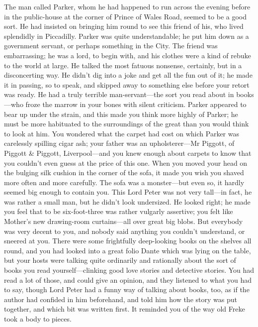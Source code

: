 The man called Parker, whom he had happened to run across the evening before in the public-house at the corner of Prince of Wales Road, seemed to be a good sort. He had insisted on bringing him round to see this friend of his, who lived splendidly in Piccadilly. Parker was quite understandable; he put him down as a government servant, or perhaps something in the City. The friend was embarrassing; he was a lord, to begin with, and his clothes were a kind of rebuke to the world at large. He talked the most fatuous nonsense, certainly, but in a disconcerting way. He didn’t dig into a joke and get all the fun out of it; he made it in passing, so to speak, and skipped away to something else before your retort was ready. He had a truly terrible man-servant\allowbreak---\allowbreak the sort you read about in books\allowbreak---\allowbreak who froze the marrow in your bones with silent criticism. Parker appeared to bear up under the strain, and this made you think more highly of Parker; he must be more habituated to the surroundings of the great than you would think to look at him. You wondered what the carpet had cost on which Parker was carelessly spilling cigar ash; your father was an upholsterer\allowbreak---\allowbreak Mr Piggott, of Piggott \& Piggott, Liverpool\allowbreak---\allowbreak and you knew enough about carpets to know that you couldn’t even guess at the price of this one. When you moved your head on the bulging silk cushion in the corner of the sofa, it made you wish you shaved more often and more carefully. The sofa was a monster\allowbreak---\allowbreak but even so, it hardly seemed big enough to contain you. This Lord Peter was not very tall\allowbreak---\allowbreak in fact, he was rather a small man, but he didn’t look undersized. He looked right; he made you feel that to be six-foot-three was rather vulgarly assertive; you felt like Mother’s new drawing-room curtains\allowbreak---\allowbreak all over great big blobs. But everybody was very decent to you, and nobody said anything you couldn’t understand, or sneered at you. There were some frightfully deep-looking books on the shelves all round, and you had looked into a great folio Dante which was lying on the table, but your hosts were talking quite ordinarily and rationally about the sort of books you read yourself\allowbreak---\allowbreak clinking good love stories and detective stories. You had read a lot of those, and could give an opinion, and they listened to what you had to say, though Lord Peter had a funny way of talking about books, too, as if the author had confided in him beforehand, and told him how the story was put together, and which bit was written first. It reminded you of the way old Freke took a body to pieces.

